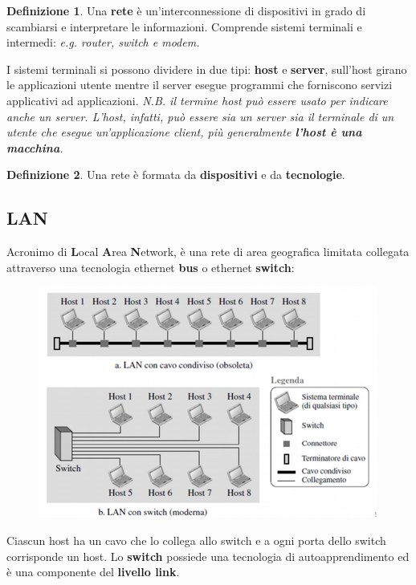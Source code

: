 \documentclass[11pt,a4paper]{article}
\theoremstyle{definition}
\newtheorem{definition}{Definizione}[section]
\begin{document}
\theoremstyle{definition}
\begin{definition}
	Una \textbf{rete} è un'interconnessione di dispositivi in grado di scambiarsi e interpretare le informazioni. Comprende sistemi terminali e intermedi: \textit{e.g. router, switch e modem.}
\end{definition}
I sistemi terminali si possono dividere in due tipi: \textbf{host} e \textbf{server}, sull'host girano le applicazioni utente mentre il server esegue programmi che forniscono servizi applicativi ad applicazioni. \newline \textit{N.B. il termine host può essere usato per indicare anche un server. \newline L'host, infatti, può essere sia un server sia il terminale di un utente che esegue un'applicazione client, più generalmente \textbf{l'host è una macchina}.}

\theoremstyle{definition}
\begin{definition}
	Una rete è formata da \textbf{dispositivi} e da \textbf{tecnologie}.
\end{definition}

\subsection{LAN}
Acronimo di \textbf{L}ocal \textbf{A}rea \textbf{N}etwork, è
una rete di area geografica limitata collegata attraverso una tecnologia ethernet \textbf{bus} o ethernet \textbf{switch}:
\begin{figure}[!h]
	\includegraphics[scale=0.6]{Immagini/LAN.png}
	\centering
\end{figure}
Ciascun host ha un cavo che lo collega allo switch e a ogni porta dello switch corrisponde un host. Lo \textbf{switch} possiede una tecnologia di autoapprendimento ed è una componente del \textbf{livello link}.
\newpage
\end{document}

